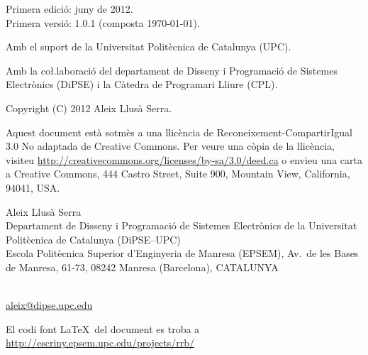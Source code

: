 {
  \thispagestyle{empty}

  \mbox{}

  \vfill

  Primera edició: juny de 2012. %
  \\
  {\small Primera versió: 1.0.1 (composta \today).} 

  \mbox{}

  {\footnotesize
  Amb el suport de la Universitat Politècnica de Catalunya (UPC).
  
  Amb la co\l.laboració del
  departament de Disseny i Programació de Sistemes Electrònics
  (DiPSE) i la Càtedra de Programari Lliure (CPL).
  }

  \mbox{}

  \cc\bysa

  {\small
  Copyright (C) 2012 Aleix Llusà Serra.
  

  {\footnotesize
    Aquest document està sotmès a una llicència de Reconeixement-CompartirIgual 3.0 No adaptada de Creative Commons. Per veure una còpia de la llicència, visiteu \url{http://creativecommons.org/licenses/by-sa/3.0/deed.ca} o envieu una carta a Creative Commons, 444 Castro Street, Suite 900, Mountain View, California, 94041, USA.
  }


    Aleix Llusà Serra\\
    Departament de Disseny i Programació de Sistemes Electrònics
      de la Universitat Politècnica de Catalunya (DiPSE--UPC)\\
    Escola Politècnica Superior d'Enginyeria de Manresa (EPSEM),
    Av.\ de les Bases de Manresa, 61-73,
    08242 Manresa (Barcelona),
    CATALUNYA 
    }\\
    \url{aleix@dipse.upc.edu}

    {\footnotesize
      El codi font \LaTeX\ del document es troba a 
      \url{http://escriny.epsem.upc.edu/projects/rrb/}
    }
}


